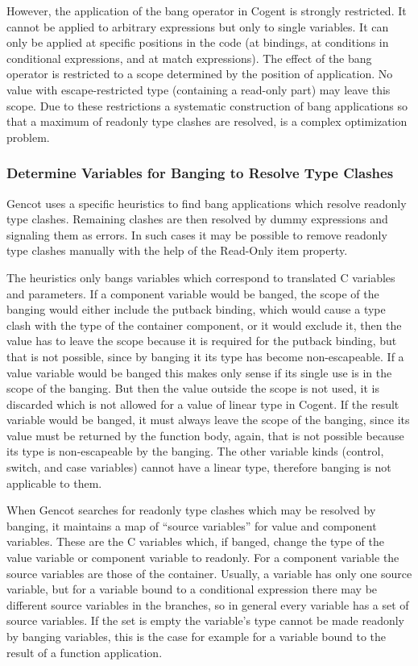 However, the application of the bang operator in Cogent is strongly restricted. It cannot be applied to arbitrary expressions
but only to single variables. It can only be applied at specific positions in the code (at bindings, at conditions in conditional
expressions, and at match expressions). The effect of the bang operator is restricted to a scope determined by the position of
application. No value with escape-restricted type (containing a read-only part) may leave this scope. Due to these restrictions
a systematic construction of bang applications so that a maximum of readonly type clashes are resolved, is a complex optimization
problem.

\subsubsection{Determine Variables for Banging to Resolve Type Clashes}

Gencot uses a specific heuristics to find bang applications which resolve readonly type clashes. Remaining clashes are then
resolved by dummy expressions and signaling them as errors. In such cases it may be possible to remove readonly type clashes
manually with the help of the Read-Only item property.

The heuristics only bangs variables which correspond to translated C variables and parameters. If a component variable would
be banged, the scope of the banging would either include the putback binding, which would cause a type clash with the type of
the container component, or it would exclude it, then the value has to leave the scope because it is required for the putback
binding, but that is not possible, since by banging it its type has become non-escapeable. If a value variable would be banged
this makes only sense if its single use is in the scope of the banging. But then the value outside the scope is not used, it
is discarded which is not allowed for a value of linear type in Cogent. If the result variable would be banged, it must always
leave the scope of the banging, since its value must be returned by the function body, again, that is not possible because its
type is non-escapeable by the banging. The other variable kinds (control, switch, and case variables) cannot have a linear
type, therefore banging is not applicable to them.

When Gencot searches for readonly type clashes which may be resolved by banging, it maintains a map of ``source variables'' for
value and component variables. These are the C variables which, if banged, change the type of the value variable or component
variable to readonly. For a component variable the source variables are those of the container. Usually, a variable has only
one source variable, but for a variable bound to a conditional expression there may be different source variables in the branches,
so in general every variable has a set of source variables. If the set is empty the variable's type cannot be made readonly
by banging variables, this is the case for example for a variable bound to the result of a function application.

